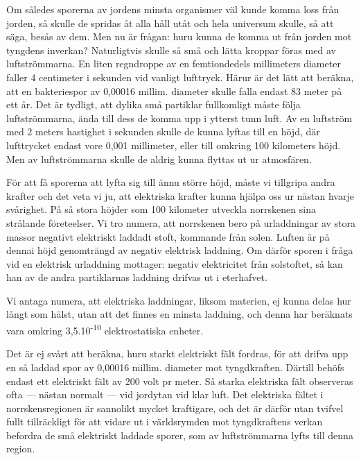 \documentclass[a4paper, 12pt, oneside, swedish]{article}
\begin{document}
Om således sporerna av jordens minsta organismer väl kunde komma loss från jorden, så skulle de spridas åt alla håll utåt och hela universum skulle, så att säga, besås av dem. Men nu är frågan: huru kunna de komma ut från jorden mot tyngdens inverkan? Naturligtvis skulle så små och lätta kroppar föras med av luftströmmarna. En liten regndroppe av en femtiondedels millimeters diameter faller 4 centimeter i sekunden vid vanligt lufttryck. Härur är det lätt att beräkna, att en bakteriespor av 0,00016 millim. diameter skulle falla endast 83 meter på ett år. Det är tydligt, att dylika små partiklar fullkomligt måste följa luftströmmarna, ända till dess de komma upp i ytterst tunn luft. Av en luftström med 2 meters hastighet i sekunden skulle de kunna lyftas till en höjd, där lufttrycket endast vore 0,001 millimeter, eller till omkring 100 kilometers höjd. Men av luftströmmarna skulle de aldrig kunna flyttas ut ur atmosfären.

För att få sporerna att lyfta sig till ännu större höjd, måste vi tillgripa andra krafter och det veta vi ju, att elektriska krafter kunna hjälpa oss ur nästan hvarje svårighet. På så stora höjder som 100 kilometer utveckla norrskenen sina strålande företeelser. Vi tro numera, att norrskenen bero på urladdningar av stora massor negativt elektriskt laddadt stoft, kommande från solen. Luften är på dennai höjd genomträngd av negativ elektrisk laddning. Om därför sporen i fråga vid en elektrisk urladdning mottager: negativ elektricitet från solstoftet, så kan han av de andra partiklarnas laddning drifvas ut i eterhafvet.

Vi antaga numera, att elektriska laddningar, liksom materien, ej kunna delas hur långt som hälst, utan att det finnes en minsta laddning, och denna har beräknats vara omkring 3,5.10\textsuperscript{-10} elektrostatiska enheter.

Det är ej svårt att beräkna, huru starkt elektriskt fält fordras, för att drifva upp en så laddad spor av 0,00016 millim. diameter mot tyngdkraften. Därtill behöfs endast ett elektriskt fält av 200 volt pr meter. Så starka elektriska fält observeras ofta --- nästan normalt --- vid jordytan vid klar luft. Det elektriska fältet i norrskensregionen är sannolikt mycket kraftigare, och det är därför utan tvifvel fullt tillräckligt för att vidare ut i världsrymden mot tyngdkraftens verkan befordra de små elektriskt laddade sporer, som av luftströmmarna lyfts till denna region.
\end{document}
